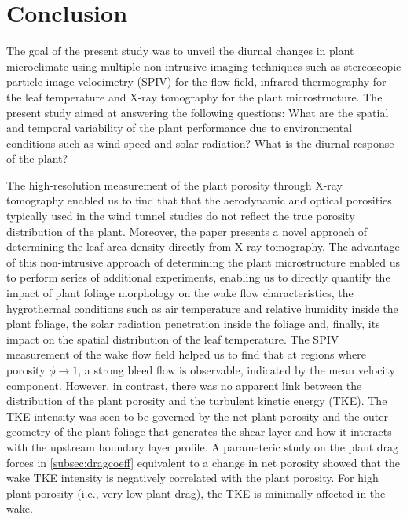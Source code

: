 \section{Conclusion}

The goal of the present study was to unveil the diurnal changes in plant microclimate using multiple non-intrusive imaging techniques such as stereoscopic particle image velocimetry (SPIV) for the flow field, infrared thermography for the leaf temperature and X-ray tomography for the plant microstructure. The present study aimed at answering the following questions: What are the spatial and temporal variability of the plant performance due to environmental conditions such as wind speed and solar radiation? What is the diurnal response of the plant? 

The high-resolution measurement of the plant porosity through X-ray tomography enabled us to find that that the aerodynamic and optical porosities typically used in the wind tunnel studies do not reflect the true porosity distribution of the plant. Moreover, the paper presents a novel approach of determining the leaf area density directly from X-ray tomography. The advantage of this non-intrusive approach of determining the plant microstructure enabled us to perform series of additional experiments, enabling us to directly quantify the impact of plant foliage morphology on the wake flow characteristics, the hygrothermal conditions such as air temperature and relative humidity inside the plant foliage, the solar radiation penetration inside the foliage and, finally, its impact on the spatial distribution of the leaf temperature. The SPIV measurement of the wake flow field helped us to find that at regions where porosity $\phi\rightarrow 1$, a strong bleed flow is observable, indicated by the mean velocity component. However, in contrast, there was no apparent link between the distribution of the plant porosity and the turbulent kinetic energy (TKE). The TKE intensity was seen to be governed by the net plant porosity and the outer geometry of the plant foliage that generates the shear-layer and how it interacts with the upstream boundary layer profile. A parameteric study on the plant drag forces in \cref{subsec:dragcoeff} equivalent to a change in net porosity showed that the wake TKE intensity is negatively correlated with the plant porosity. For high plant porosity (i.e., very low plant drag), the TKE is minimally affected in the wake.

